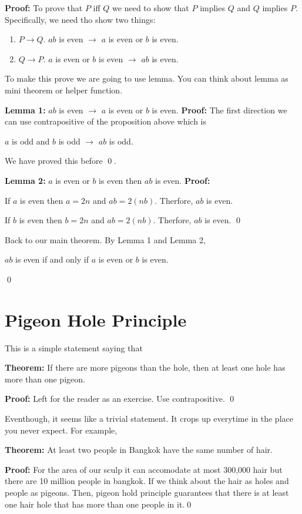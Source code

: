 \documentclass[a4paper, 12pt]{article}
\newcommand{\theorem}{\noindent\textbf{Theorem:} }
\renewcommand{\proof}{\noindent\textbf{Proof:} }
\newcommand{\lemma}[1]{\noindent\textbf{Lemma #1:} }
\newcommand{\qedd}{\qed\newline}
\theoremstyle{examplestyle}
\begin{document}
\begin{multicols}{2}
\proof To prove that $P$ iff $Q$ we need to show that $P$ implies $Q$ and $Q$ implies $P$. Specifically, we need tho show two things:
\begin{enumerate}
	\item $P \to Q$. $ab$ is even $\to$ $a$ is even or $b$ is even.
	\item $Q \to P$. $a$ is even or $b$ is even $\to$ $ab$ is even.
\end{enumerate}

To make this prove we are going to use lemma. You can think about lemma as mini theorem or helper function.

\lemma{1} $ab$ is even $\to$ $a$ is even or $b$ is even.
\proof
The first direction we can use contrapositive of the proposition above which is
\begin{center}
	$a$ is odd and $b$ is odd $\to$ $ab$ is odd.
\end{center}
We have proved this before \qedd.


\lemma{2} $a$ is even or $b$ is even then $ab$ is even.
\proof 

If $a$ is even then $a=2n$ and $ab=2(nb)$. Therfore, $ab$ is even.

If $b$ is even then $b=2n$ and $ab=2(nb)$. Therfore, $ab$ is even.
\qedd


Back to our main theorem. By Lemma 1 and Lemma 2,
\begin{center}
	$ab$ is even if and only if $a$ is even or $b$ is even.
\end{center}


\qedd

\section*{Pigeon Hole Principle}

This is a simple statement saying that

\theorem If there are more pigeons than the hole, then at least one hole has more than one pigeon.

\proof Left for the reader as an exercise. Use contrapositive.
\qedd

Eventhough, it seems like a trivial statement. It crops up everytime in the place you never expect. For example,

\theorem At least two people in Bangkok have the same number of hair.

\proof For the area of our sculp it can accomodate at most 300,000 hair but there are 10 million people in bangkok. If we think about the hair as holes and people as pigeons. Then, pigeon hold principle guarantees that there is at least one hair hole that has more than one people in it.\qedd


\end{multicols}
\end{document}
